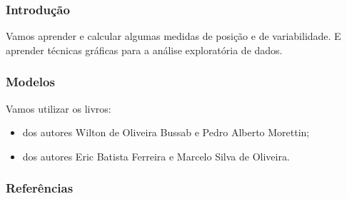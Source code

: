 \documentclass[12pt]{beamer}
\begin{document}
\begin{frame}{}
\frametitle{Introdução}
\begin{block}{}
\justifying
Vamos aprender e calcular algumas medidas de posição e de variabilidade. E aprender técnicas gráficas para a análise exploratória de dados. 
\end{block}
\end{frame}

\begin{frame}{}
\frametitle{Modelos}
\begin{block}{}
\justifying
Vamos utilizar os livros:
\begin{itemize}
    \item {} dos autores Wilton de Oliveira Bussab e Pedro Alberto Morettin;
    \item {} dos autores Eric Batista Ferreira e Marcelo Silva de Oliveira.
\end{itemize}
\end{block}
\end{frame}


\begin{frame}[allowframebreaks]
\frametitle{\bf Referências}
\printbibliography
\end{frame}
\end{document}
